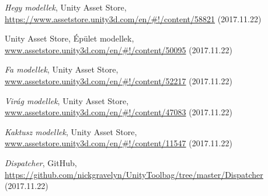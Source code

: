\begin{thebibliography}{x}
\emph{Hegy modellek}, Unity Asset Store, \\
\url{https://www.assetstore.unity3d.com/en/\#!/content/58821} (2017.11.22)

Unity Asset Store, Épület modellek, \\
\url{www.assetstore.unity3d.com/en/\#!/content/50095} (2017.11.22)

\emph{Fa modellek}, Unity Asset Store, \\
\url{www.assetstore.unity3d.com/en/\#!/content/52217} (2017.11.22)

\emph{Virág modellek}, Unity Asset Store, \\
\url{www.assetstore.unity3d.com/en/\#!/content/47083} (2017.11.22)

\emph{Kaktusz modellek}, Unity Asset Store, \\
\url{www.assetstore.unity3d.com/en/\#!/content/11547} (2017.11.22)

\emph{Dispatcher}, GitHub, \\
\url{https://github.com/nickgravelyn/UnityToolbag/tree/master/Dispatcher} (2017.11.22)

\end{thebibliography}